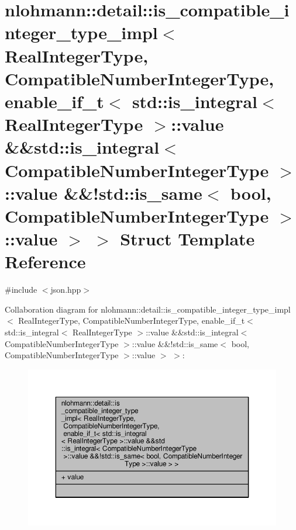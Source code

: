 \hypertarget{structnlohmann_1_1detail_1_1is__compatible__integer__type__impl_3_01RealIntegerType_00_01Compatie5920c849e839ebb9f8c57349c900796}{}\section{nlohmann\+:\+:detail\+:\+:is\+\_\+compatible\+\_\+integer\+\_\+type\+\_\+impl$<$ Real\+Integer\+Type, Compatible\+Number\+Integer\+Type, enable\+\_\+if\+\_\+t$<$ std\+:\+:is\+\_\+integral$<$ Real\+Integer\+Type $>$\+:\+:value \&\&std\+:\+:is\+\_\+integral$<$ Compatible\+Number\+Integer\+Type $>$\+:\+:value \&\&!std\+:\+:is\+\_\+same$<$ bool, Compatible\+Number\+Integer\+Type $>$\+:\+:value $>$ $>$ Struct Template Reference}
\label{structnlohmann_1_1detail_1_1is__compatible__integer__type__impl_3_01RealIntegerType_00_01Compatie5920c849e839ebb9f8c57349c900796}


{\ttfamily \#include $<$json.\+hpp$>$}



Collaboration diagram for nlohmann\+:\+:detail\+:\+:is\+\_\+compatible\+\_\+integer\+\_\+type\+\_\+impl$<$ Real\+Integer\+Type, Compatible\+Number\+Integer\+Type, enable\+\_\+if\+\_\+t$<$ std\+:\+:is\+\_\+integral$<$ Real\+Integer\+Type $>$\+:\+:value \&\&std\+:\+:is\+\_\+integral$<$ Compatible\+Number\+Integer\+Type $>$\+:\+:value \&\&!std\+:\+:is\+\_\+same$<$ bool, Compatible\+Number\+Integer\+Type $>$\+:\+:value $>$ $>$\+:
\nopagebreak
\begin{figure}[H]
\begin{center}
\leavevmode
\includegraphics[width=350pt]{structnlohmann_1_1detail_1_1is__compatible__integer__type__impl_3_01RealIntegerType_00_01Compati9e1648edfab196390907b5831efed54c}
\end{center}
\end{figure}
